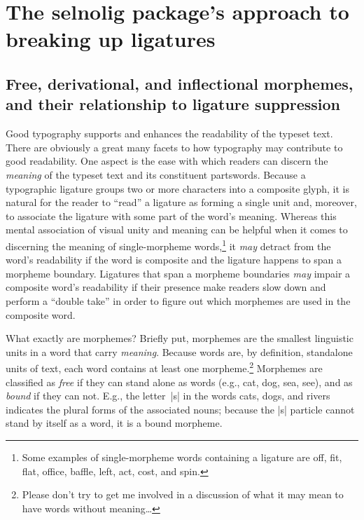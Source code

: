 \documentclass[11pt]{article}
\newcommand{\pkg}[1]{\textsf{#1}}
\begin{document}
\section[The selnolig package's approach to breaking up ligatures]{The \pkg{selnolig} package's approach to breaking up ligatures} \label{sec:approach}

\subsection[Free, derivational, and inflectional morphemes]{Free, derivational, and inflectional morphemes, and their relationship to ligature suppression}

Good typography supports and enhances the readability of the typeset text. There are obviously a great many facets to how typography may contribute to good readability. One aspect is the ease with which readers can discern the \emph{meaning} of the typeset text and its constituent parts\textemdash words. Because a typographic ligature groups two or more characters into a composite glyph, it is natural for the reader to \enquote{read} a ligature as forming a single unit and, moreover, to associate the ligature with some part of the word's meaning. Whereas this mental association of visual unity and meaning can be helpful when it comes to discerning the meaning of single-morpheme words,\footnote{Some examples of single-morpheme words containing a ligature are off, fit, flat, office, baffle, left, act, cost, and spin.} it \emph{may} detract from the word's readability if the word is composite and the ligature happens to span a morpheme boundary. Ligatures that span a morpheme boundaries \emph{may} impair a composite word's readability if their presence make readers slow down and perform a \enquote{double take} in order to figure out which morphemes are used in the composite word.

What exactly are morphemes? Briefly put, morphemes are the smallest linguistic units in a word that carry \emph{meaning}. Because words are, by definition, standalone units of text, each word contains at least one morpheme.\footnote{Please don't try to get me involved in a discussion of what it may mean to have words without meaning\dots} Morphemes are classified as \emph{free} if they can stand alone as words (e.g., cat, dog, sea, see), and as \emph{bound} if they can not. E.g., the letter~|s| in the words cats, dogs, and rivers indicates the plural forms of the associated nouns; because the |s| particle cannot stand by itself as a word, it is a bound morpheme. 
\end{document}
